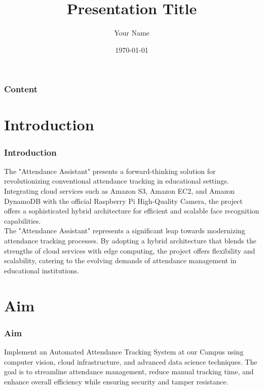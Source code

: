 \documentclass[aspectratio=169]{beamer}
\title{Presentation Title}
\author{Your Name}
\date{\today}
\begin{document}
\begin{frame}
	\titlepage
\end{frame}

\begin{frame}
	\frametitle{Content}
	\tableofcontents
\end{frame}

\section{Introduction}
\begin{frame}
	\centering
	\frametitle{Introduction}
	\begin{minipage}{0.95\textwidth}

		The "Attendance Assistant" presents a forward-thinking solution for revolutionizing conventional attendance tracking in educational settings. Integrating cloud services such as Amazon S3, Amazon EC2, and Amazon DynamoDB with the official Raspberry Pi High-Quality Camera, the project offers a sophisticated hybrid architecture for efficient and scalable face recognition capabilities.\\
		\vspace{0.5cm}
		The "Attendance Assistant" represents a significant leap towards modernizing attendance tracking processes. By adopting a hybrid architecture that blends the strengths of cloud services with edge computing, the project offers flexibility and scalability, catering to the evolving demands of attendance management in educational institutions.
	\end{minipage}
\end{frame}

\section{Aim}
\begin{frame}
	\centering
	\frametitle{Aim}
	\begin{minipage}{0.95\textwidth}
		Implement an Automated Attendance Tracking System at our Campus using computer vision, cloud infrastructure, and advanced data science techniques. The goal is to streamline attendance management, reduce manual tracking time, and enhance overall efficiency while ensuring security and tamper resistance.
	\end{minipage}
\end{frame}
\end{document}
